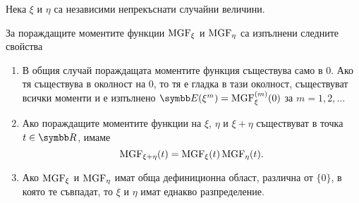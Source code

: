 \documentclass[
  headings=standardclasses,
  bibliography=totocnumbered,
]{scrartcl}
\begin{document}
\begin{theorem}\label{thm:mgf_properties}
  Нека \( \xi \) и \( \eta \) са независими непрекъснати случайни величини.

  За пораждащите моментите функции \( \operatorname{MGF}_\xi \) и \( \operatorname{MGF}_\eta \) са изпълнени следните свойства
  \begin{enumerate}
    \item В общия случай пораждащата моментите функция съществува само в \( 0 \). Ако тя съществува в околност на \( 0 \), то тя е гладка в тази околност, съществуват всички моменти и е изпълнено \( \Expect(\xi^m) = \MGF_\xi^{(m)} (0) \) за \( m = 1, 2, \ldots \)

    \item Ако пораждащите моментите функции на \( \xi \), \( \eta \) и \( \xi + \eta \) съществуват в точка \( t \in \R \), имаме
    \begin{equation*}
      \operatorname{MGF}_{\xi + \eta}(t) = \operatorname{MGF}_\xi(t) \operatorname{MGF}_\eta(t).
    \end{equation*}

    \item Ако \( \operatorname{MGF}_\xi \) и \( \operatorname{MGF}_\eta \) имат обща дефиниционна област, различна от \( \{ 0 \} \), в която те съвпадат, то \( \xi \) и \( \eta \) имат еднакво разпределение.
  \end{enumerate}
\end{theorem}
\end{document}

